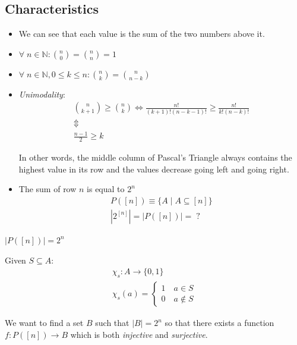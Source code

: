 \documentclass[00_complete]{subfiles}
\begin{document}
\subsection{Characteristics}
\begin{itemize}
    \item We can see that each value is the sum of the two numbers above it.
    \item $\forall \; n \in \mathbb{N}: \binom{n}{0} = \binom{n}{n} = 1$
    \item $\forall \; n \in \mathbb{N}, 0 \leq k \leq n: \binom{n}{k} = \binom{n}{n-k}$
    \item \emph{Unimodality}:
\begin{gather*}
 \binom{n}{k+1} \geq \binom{n}{k} \iff \frac{n!}{(k+1)!(n-k-1)!} \geq \frac{n!}{k!(n-k)!} \\
 \Updownarrow \\
 \frac{n-1}{2} \geq k
\end{gather*}

In other words, the middle column of Pascal's Triangle always contains the
highest value in its row and the values decrease going left and going right.

 \item The sum of row $n$ is equal to $2^n$
\begin{gather*}
    P([n]) \equiv \{A \mid A \subseteq [n]\} \\
    | 2^{[n]}| = |P([n])| = \;?
\end{gather*}
\end{itemize}

\begin{claim}
$|P([n])|=2^n$

Given $S \subseteq A$:
\begin{gather*}
\chi_s: A \to \{0,1\} \\
\chi_s(a) = \begin{cases}
    1 \quad a \in S \\
    0 \quad a \notin S
\end{cases}
\end{gather*}

We want to find a set $B$ such that $|B|=2^n$ so that there exists a function
$f: P([n]) \to B$ which is both \emph{injective} and \emph{surjective}.
\end{claim}
\end{document}
